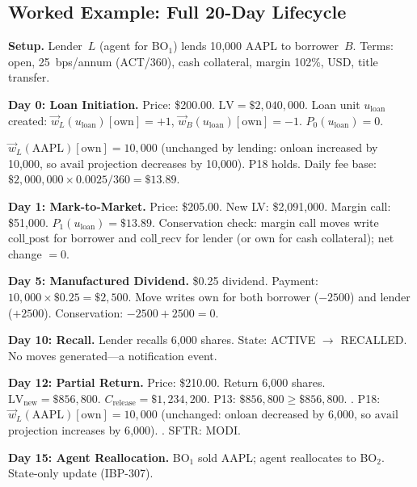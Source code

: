 \documentclass[11pt,a4paper]{article}
\begin{document}
\subsection{Worked Example: Full 20-Day Lifecycle}
\label{sec:sbl-example}

\noindent\textbf{Setup.} Lender~$L$ (agent for BO$_1$) lends 10{,}000 AAPL to borrower~$B$. Terms: open, 25~bps/annum (ACT/360), cash collateral, margin 102\%, USD, title transfer.

\medskip
\noindent\textbf{Day 0: Loan Initiation.} Price: \$200.00. $\mathrm{LV} = \$2{,}040{,}000$. Loan unit $u_{\mathrm{loan}}$ created: $\vec{w}_L(u_{\mathrm{loan}})[\mathrm{own}] = +1$, $\vec{w}_B(u_{\mathrm{loan}})[\mathrm{own}] = -1$. $P_0(u_{\mathrm{loan}}) = 0$.

$\vec{w}_L(\text{AAPL})[\mathrm{own}] = 10{,}000$ (unchanged by lending: $\mathrm{onloan}$ increased by 10{,}000, so $\mathrm{avail}$ projection decreases by 10{,}000). P18 holds. Daily fee base: $\$2{,}000{,}000 \times 0.0025 / 360 = \$13.89$.

\medskip
\noindent\textbf{Day 1: Mark-to-Market.} Price: \$205.00. New LV: \$2{,}091{,}000. Margin call: \$51{,}000. $P_1(u_{\mathrm{loan}}) = \$13.89$. Conservation check: margin call moves write $\mathrm{coll\_post}$ for borrower and $\mathrm{coll\_recv}$ for lender (or $\mathrm{own}$ for cash collateral); net change $= 0$. \checkmark

\medskip
\noindent\textbf{Day 5: Manufactured Dividend.} \$0.25 dividend. Payment: $10{,}000 \times \$0.25 = \$2{,}500$. Move writes $\mathrm{own}$ for both borrower ($-2500$) and lender ($+2500$). Conservation: $-2500 + 2500 = 0$. \checkmark

\medskip
\noindent\textbf{Day 10: Recall.} Lender recalls 6{,}000 shares. State: ACTIVE $\to$ RECALLED. No moves generated---a notification event.

\medskip
\noindent\textbf{Day 12: Partial Return.} Price: \$210.00. Return 6{,}000 shares. $\mathrm{LV}_{\mathrm{new}} = \$856{,}800$. $C_{\mathrm{release}} = \$1{,}234{,}200$. P13: $\$856{,}800 \geq \$856{,}800$. \checkmark. P18: $\vec{w}_L(\text{AAPL})[\mathrm{own}] = 10{,}000$ (unchanged: $\mathrm{onloan}$ decreased by 6{,}000, so $\mathrm{avail}$ projection increases by 6{,}000). \checkmark. SFTR: MODI.

\medskip
\noindent\textbf{Day 15: Agent Reallocation.} BO$_1$ sold AAPL; agent reallocates to BO$_2$. State-only update (IBP-307).
\end{document}
